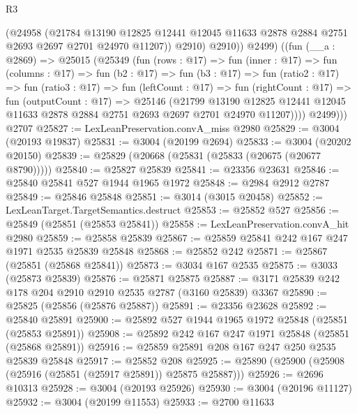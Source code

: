 \begin{lexlean}{R3}
\begin{coremodule}
              (@24958
                (@21784
                  @13190
                  @12825
                  @12441
                  @12045
                  @11633
                  @2878
                  @2884
                  @2751
                  @2693
                  @2697
                  @2701
                  @24970
                  @11207))
              @2910)
            @2910))
          @2499)
        ((fun (__a : @2869) =>
        @25015
          (@25349
            (fun (rows : @17) =>
            fun (inner : @17) =>
            fun (columns : @17) =>
            fun (b2 : @17) =>
            fun (b3 : @17) =>
            fun (ratio2 : @17) =>
            fun (ratio3 : @17) =>
            fun (leftCount : @17) =>
            fun (rightCount : @17) =>
            fun (outputCount : @17) =>
            @25146
              (@21799
                @13190
                @12825
                @12441
                @12045
                @11633
                @2878
                @2884
                @2751
                @2693
                @2697
                @2701
                @24970
                @11207))))
          @2499)))
    @2707
@25827 := LexLeanPreservation.convA_miss @2980
@25829 := @3004 (@20193 @19837)
@25831 := @3004 (@20199 @2694)
@25833 := @3004 (@20202 @20150)
@25839 := @25829 (@20668 (@25831 (@25833 (@20675 (@20677 @8790)))))
@25840 := @25827 @25839
@25841 := @23356 @23631
@25846 := @25840 @25841 @527 @1944 @1965 @1972
@25848 := @2984 @2912 @2787
@25849 := @25846 @25848
@25851 := @3014 (@3015 @20458)
@25852 := LexLeanTarget.TargetSemantics.destruct
@25853 := @25852 @527
@25856 := @25849 (@25851 (@25853 @25841))
@25858 := LexLeanPreservation.convA_hit @2980
@25859 := @25858 @25839
@25867 := @25859 @25841 @242 @167 @247 @1971 @2535 @25839 @25848
@25868 := @25852 @242
@25871 := @25867 (@25851 (@25868 @25841))
@25873 := @3034 @167 @2535
@25875 := @3033 (@25873 @25839)
@25876 := @25871 @25875
@25887 := @3171 @25839 @242 @178 @204 @2910 @2910 @2535 @2787 (@3160 @25839) @3367
@25890 := @25825 (@25856 (@25876 @25887))
@25891 := @23356 @23628
@25892 := @25840 @25891
@25900 := @25892 @527 @1944 @1965 @1972 @25848 (@25851 (@25853 @25891))
@25908 := @25892 @242 @167 @247 @1971 @25848 (@25851 (@25868 @25891))
@25916 := @25859 @25891 @208 @167 @247 @250 @2535 @25839 @25848
@25917 := @25852 @208
@25925 := @25890 (@25900 (@25908 (@25916 (@25851 (@25917 @25891)) @25875 @25887)))
@25926 := @2696 @10313
@25928 := @3004 (@20193 @25926)
@25930 := @3004 (@20196 @11127)
@25932 := @3004 (@20199 @11553)
@25933 := @2700 @11633

\end{coremodule}
\end{lexlean}
